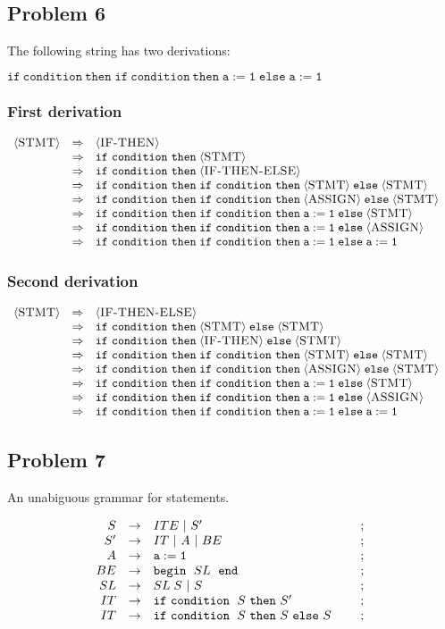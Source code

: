 \documentclass[12pt]
{article}
\newcommand\mygrammar[1]{
$$
\begin{array}{rcll}
#1
\end{array}
$$
}
\newcommand\gr[3]{\ensuremath{{\mit #1} &\rightarrow& #2 & ~~~~;~#3} \\}
\newcommand\dr[2]{\ensuremath{{\mit #1} &\Rightarrow& #2 &} \\}
\newcommand\db[1]{\ensuremath{&\Rightarrow& #1 &} \\}
\def\por{~|~}
\def\mt{\mathtt}
\newcommand\nterm[1]{\ensuremath{\langle\mbox{{\sc #1}}\rangle}}
\def\STMT{\nterm{STMT}}
\def\IT{\nterm{IF-THEN}}
\def\A{\nterm{ASSIGN}}
\def\ITE{\nterm{IF-THEN-ELSE}}
\begin{document}
\subsection*{Problem 6}

The following string has two derivations:

$\mt{if ~condition~ then} \; \mt{if ~condition~ then} \; \mt{a:=1} \; \mt{else}\; \mt{a:=1}$

\subsubsection*{First derivation}

\mygrammar{
\dr{\STMT}{\IT}
\db{\mt{if ~condition~ then} \; \STMT}
\db{\mt{if ~condition~ then} \; \ITE}
\db{\mt{if ~condition~ then} \; \mt{if ~condition~ then} \; \STMT \; \mt{else}\; \STMT}
\db{\mt{if ~condition~ then} \; \mt{if ~condition~ then} \; \A \; \mt{else}\; \STMT}
\db{\mt{if ~condition~ then} \; \mt{if ~condition~ then} \; \mt{a:=1} \; \mt{else}\; \STMT}
\db{\mt{if ~condition~ then} \; \mt{if ~condition~ then} \; \mt{a:=1} \; \mt{else}\; \A}
\db{\mt{if ~condition~ then} \; \mt{if ~condition~ then} \; \mt{a:=1} \; \mt{else}\; \mt{a:=1}}
}

\subsubsection*{Second derivation}

\mygrammar{
\dr{\STMT}{\ITE}
\db{\mt{if ~condition~ then} \; \STMT \; \mt{else}\; \STMT}
\db{\mt{if ~condition~ then} \; \IT\; \mt{else}\; \STMT}
\db{\mt{if ~condition~ then} \; \mt{if ~condition~ then} \; \STMT \; \mt{else}\; \STMT}
\db{\mt{if ~condition~ then} \; \mt{if ~condition~ then} \; \A \; \mt{else}\; \STMT}
\db{\mt{if ~condition~ then} \; \mt{if ~condition~ then} \; \mt{a:=1} \; \mt{else}\; \STMT}
\db{\mt{if ~condition~ then} \; \mt{if ~condition~ then} \; \mt{a:=1} \; \mt{else}\; \A}
\db{\mt{if ~condition~ then} \; \mt{if ~condition~ then} \; \mt{a:=1} \; \mt{else}\; \mt{a:=1}}
}

\subsection*{Problem 7}

An unabiguous grammar for statements.  

\mygrammar{
\gr{S}{ITE \por S'}{}
\gr{S'}{IT \por A \por BE}{}
\gr{A}{\mt{a:=1}}{}
\gr{BE}{\mt{begin~} \; SL \; \mt{~end}}{}
\gr{SL}{SL \; S \por S}{}
\gr{IT}{\mt{if ~condition~} \; S \mt{~then~} S'}{}
\gr{IT}{\mt{if ~condition~} \; S \mt{~then~} S \mt{~else~} S}{}
}
\end{document}

